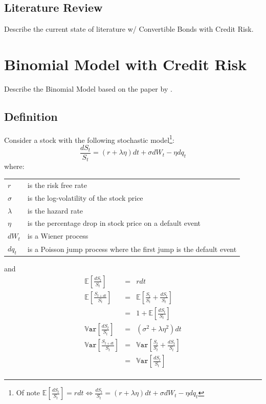 \documentclass[a4paper,11pt,oneside]{report}
\theoremstyle{plain}
\theoremstyle{definition}
\def\E{\mathbb{E}}
\def\Var{\mathbb{V}\mathtt{ar}}
\def\S{\ensuremath{S_t}\xspace}
\def\dS{\ensuremath{dS_t}\xspace}
\def\dt{\ensuremath{dt}\xspace}
\def\dW{\ensuremath{dW_t}\xspace}
\def\dq{\ensuremath{dq_t}\xspace}
\begin{document}
\section{Literature Review}
Describe the current state of literature w/ Convertible Bonds with Credit Risk.

\chapter{Binomial Model with Credit Risk}
Describe the Binomial Model based on the paper by \citet{MK12}.

\section{Definition}
Consider a stock with the following stochastic model\footnote{Of note $\mathbb{E}[\frac{\dS}{\S}] = r\dt \Leftrightarrow \frac{\dS}{\S} = (r + \lambda\eta)\dt + \sigma\dW - \eta\dq$}:
\begin{displaymath}
 \frac{\dS}{\S} = (r + \lambda\eta)\dt + \sigma\dW - \eta\dq
\end{displaymath}
where:

\begin{tabular}{ll}
 $r$            & is the risk free rate \\
 $\sigma$       & is the log-volatility of the stock price \\
 $\lambda$      & is the hazard rate \\
 $\eta$         & is the percentage drop in stock price on a default event \\
 \dW            & is a Wiener process \\
 \dq            & is a Poisson jump process where the first jump is the default event \\
\end{tabular}

\noindent and
\begin{displaymath}\begin{array}{rcl}
 \E[\frac{\dS}{\S}]     &=& r\dt \\
 \E[\frac{S_{t + \dt}}{\S}] &=& \E[\frac{\S}{\S} + \frac{\dS}{\S}] \\
                        &=& 1 + \E[\frac{\dS}{\S}] \\
 \Var[\frac{\dS}{\S}]   &=& (\sigma^2 + \lambda\eta^2)\dt \\
 \Var[\frac{S_{t + \dt}}{\S}] &=& \Var[\frac{\S}{\S} + \frac{\dS}{\S}] \\
                        &=& \Var[\frac{\dS}{\S}] \\
\end{array}\end{displaymath}
\end{document}
